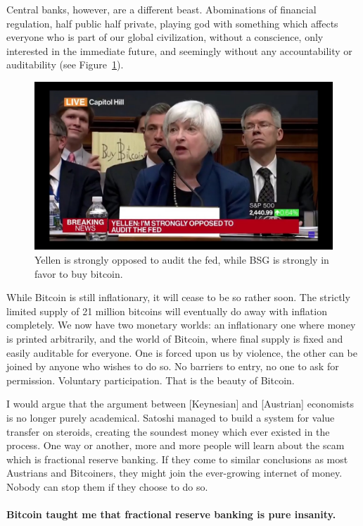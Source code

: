 Central banks, however, are a different beast. Abominations of financial
regulation, half public half private, playing god with something which
affects everyone who is part of our global civilization, without a
conscience, only interested in the immediate future, and seemingly
without any accountability or auditability (see Figure~\ref{fig:bsg}).

\begin{figure}
  \centering
  \includegraphics{assets/images/bsg.jpg}
  \caption{Yellen is strongly opposed to audit the fed, while BSG is strongly in favor to buy bitcoin.}
  \label{fig:bsg}
\end{figure}

While Bitcoin is still inflationary, it will cease to be so rather soon.
The strictly limited supply of 21 million bitcoins will eventually do
away with inflation completely. We now have two monetary worlds: an
inflationary one where money is printed arbitrarily, and the world of
Bitcoin, where final supply is fixed and easily auditable for everyone.
One is forced upon us by violence, the other can be joined by anyone who
wishes to do so. No barriers to entry, no one to ask for permission.
Voluntary participation. That is the beauty of Bitcoin.

I would argue that the argument between [Keynesian] and [Austrian]
economists is no longer purely academical. Satoshi managed to build a
system for value transfer on steroids, creating the soundest money which
ever existed in the process. One way or another, more and more people
will learn about the scam which is fractional reserve banking. If they
come to similar conclusions as most Austrians and Bitcoiners, they might
join the ever-growing internet of money. Nobody can stop them if they
choose to do so.

\paragraph{Bitcoin taught me that fractional reserve banking is pure insanity.}

